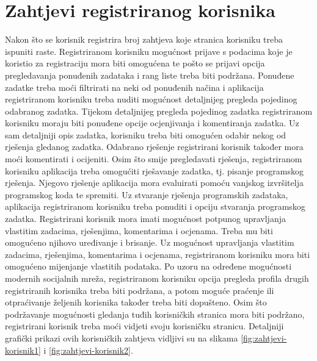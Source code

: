 \documentclass[times, utf8, zavrsni]{fer}
\begin{document}
\section{Zahtjevi registriranog korisnika}
Nakon što se korisnik registrira broj zahtjeva koje stranica korisniku treba ispuniti raste. Registriranom korisniku mogućnost prijave s podacima koje je koristio za registraciju mora biti omogućena te pošto se prijavi opcija pregledavanja ponuđenih zadataka i rang liste treba biti podržana. Ponuđene zadatke treba moći filtrirati na neki od ponuđenih načina i aplikacija registriranom korisniku treba nuditi mogućnost detaljnijeg pregleda pojedinog odabranog zadatka. Tijekom detaljnijeg pregleda pojedinog zadatka registriranom korisniku moraju biti ponuđene opcije ocjenjivanja i komentiranja zadatka. Uz sam detaljniji opis zadatka, korisniku treba biti omogućen odabir nekog od rješenja gledanog zadatka. Odabrano rješenje registrirani korisnik također mora moći komentirati i ocijeniti. Osim što smije pregledavati rješenja, registriranom korisniku aplikacija treba omogućiti rješavanje zadatka, tj. pisanje programskog rješenja. Njegovo rješenje aplikacija mora evaluirati pomoću vanjskog izvršitelja programskog koda te spremiti. Uz stvaranje rješenja programskih zadataka, aplikacija registriranom korisniku treba ponuditi i opciju stvaranja programskog zadatka. Registrirani korisnik mora imati mogućnost potpunog upravljanja vlastitim zadacima, rješenjima, komentarima i ocjenama. Treba mu biti omogućeno njihovo uređivanje i brisanje. Uz mogućnost upravljanja vlastitim zadacima, rješenjima, komentarima i ocjenama, registriranom korisniku mora biti omogućeno mijenjanje vlastitih podataka. Po uzoru na određene mogućnosti modernih socijalnih mreža, registriranom korisniku opcija pregleda profila drugih registriranih korisnika treba biti podržana, a potom moguće praćenje ili otpraćivanje željenih korisnika također treba biti dopušteno. Osim što podržavanje mogućnosti gledanja tuđih korisničkih stranica mora biti podržano, registrirani korisnik treba moći vidjeti svoju korisničku stranicu. Detaljniji grafički prikazi ovih korisničkih zahtjeva vidljivi su na slikama \ref{fig:zahtjevi-korisnik1} i \ref{fig:zahtjevi-korisnik2}.
\end{document}
